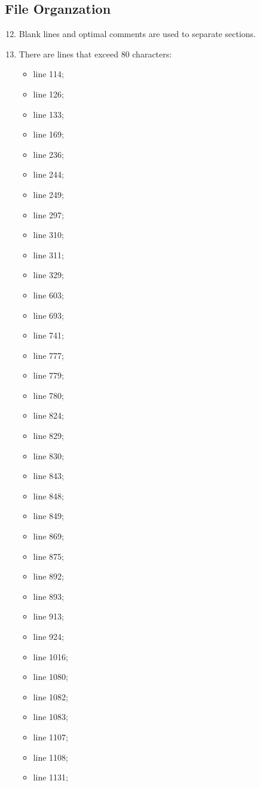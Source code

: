 \subsection{File Organzation}
\begin{enumerate}
	\setcounter{enumi}{11}
	\item Blank lines and optimal comments are used to separate sections.
	\item There are lines that exceed 80 characters:
	\begin{itemize}
		\item line 114;
		\item line 126;
		\item line 133;
		\item line 169;
		\item line 236;
		\item line 244;
		\item line 249;
		\item line 297;
		\item line 310;
		\item line 311;
		\item line 329;
		\item line 603;
		\item line 693;
		\item line 741;
		\item line 777;
		\item line 779;
		\item line 780;
		\item line 824;
		\item line 829;
		\item line 830;
		\item line 843;
		\item line 848;
		\item line 849;
		\item line 869;
		\item line 875;
		\item line 892;
		\item line 893;
		\item line 913;
		\item line 924;
		\item line 1016;
		\item line 1080;
		\item line 1082;
		\item line 1083;
		\item line 1107;
		\item line 1108;
		\item line 1131;

\end{itemize}
\end{enumerate}
